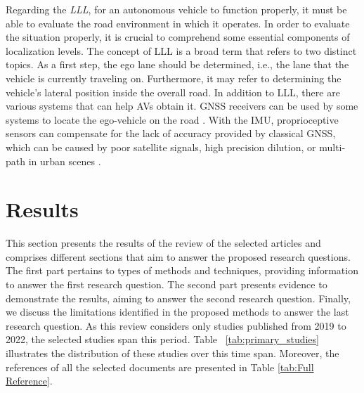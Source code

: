 \documentclass[a4paper,12pt]{article}
\begin{document}
\hspace{5mm} Regarding the \textit L\textit L\textit L, for an autonomous vehicle to function properly, it must be able to evaluate the road environment in which it operates. In order to evaluate the situation properly, it is crucial to comprehend some essential components of localization levels. The concept of LLL  is a broad term that refers to two distinct topics\cite{article32}. As a first step, the ego lane should be determined, i.e., the lane that the vehicle is currently traveling on. Furthermore, it may refer to determining the vehicle's lateral position inside the overall road. In addition to LLL, there are various systems that can help AVs obtain it. GNSS receivers can be used by some systems to locate the ego-vehicle on the road \cite{article32}. With the IMU, proprioceptive sensors can compensate for the lack of accuracy provided by classical GNSS, which can be caused by poor satellite signals, high precision dilution, or multi-path in urban scenes \cite{article32}.



\newpage

\section{Results}
\label{results}
\hspace{5mm} This section presents the results of the review of the selected articles and comprises different sections that aim to answer the proposed research questions. The first part pertains to types of methods and techniques, providing information to answer the first research question. The second part presents evidence to demonstrate the results, aiming to answer the second research question. Finally, we discuss the limitations identified in the proposed methods to answer the last research question. As this review considers only studies published from 2019 to 2022, the selected studies span this period. Table ~\ref{tab:primary_studies} illustrates the distribution of these studies over this time span. Moreover, the references of all the selected documents are presented in Table \ref{tab:Full Reference}.
\end{document}
